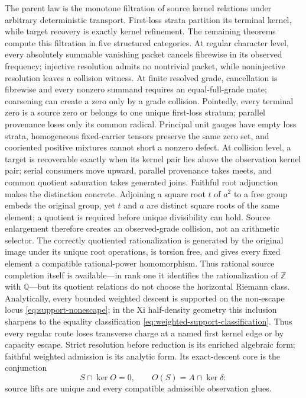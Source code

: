 \documentclass[11pt]{article}
\theoremstyle{definition}
\theoremstyle{remark}
\begin{document}
The parent law is the monotone filtration of source kernel relations under
arbitrary deterministic transport.  First-loss strata partition its terminal
kernel, while target recovery is exactly kernel refinement.  The remaining
theorems compute this filtration in five structured categories.  At regular character level, every
absolutely summable vanishing packet cancels fibrewise in its observed
frequency; injective resolution admits no nontrivial packet, while
noninjective resolution leaves a collision witness.  At finite resolved
grade, cancellation is
fibrewise and every nonzero summand requires an equal-full-grade mate;
coarsening can create a zero only by a grade collision.  Pointedly, every terminal zero is a
source zero or belongs to one unique first-loss stratum; parallel provenance
loses only its common radical.  Principal unit gauges have empty loss
strata, homogeneous fixed-carrier tensors preserve the same zero set, and
cooriented positive mixtures cannot short a nonzero defect.  At collision
level, a target is recoverable exactly when its kernel pair lies above the
observation kernel pair; serial consumers move upward, parallel provenance
takes meets, and common quotient saturation takes generated joins.
Faithful root adjunction makes the distinction concrete.  Adjoining a
square root \(t\) of \(a^2\) to a free group embeds the original group, yet
\(t\) and \(a\) are distinct square roots of the same element; a quotient is
required before unique divisibility can hold.  Source enlargement therefore
creates an observed-grade collision, not an arithmetic selector.
The correctly quotiented rationalization is generated by the original image
under its unique root operations, is torsion free, and gives every fixed
element a compatible rational-power homomorphism.  Thus rational source
completion itself is available---in rank one it identifies the
rationalization of \(\mathbb Z\) with \(\mathbb Q\)---but its quotient
relations do not choose the
horizontal Riemann class.
Analytically, every bounded weighted descent is supported on the non-escape locus
\eqref{eq:support-nonescape}; in the Xi half-density geometry this inclusion
sharpens to the equality classification
\eqref{eq:weighted-support-classification}.  Thus every regular route loses
transverse charge at a named first kernel edge or by capacity escape.  Strict
resolution before reduction is its enriched algebraic form;
faithful weighted admission is its analytic form.  Its exact-descent core is the
conjunction
\[
       S\cap\ker O=0,
       \qquad O(S)=A\cap\ker\delta:
\]
source lifts are unique and every compatible admissible observation glues.
\end{document}
